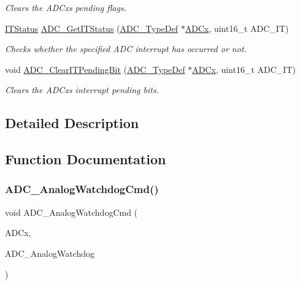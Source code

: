 \begin{DoxyCompactItemize}
\begin{DoxyCompactList}\small\item\em Clears the A\+D\+Cx\textquotesingle{}s pending flags. \end{DoxyCompactList}\item 
\mbox{\hyperlink{group___exported__types_gaacbd7ed539db0aacd973a0f6eca34074}{I\+T\+Status}} \mbox{\hyperlink{group___a_d_c___private___functions_gaa1d3b910a83dbf14d4f68c8eef058612}{A\+D\+C\+\_\+\+Get\+I\+T\+Status}} (\mbox{\hyperlink{struct_a_d_c___type_def}{A\+D\+C\+\_\+\+Type\+Def}} $\ast$\mbox{\hyperlink{group___s_t_m32_f1_x_x___n_u_c_l_e_o___l_o_w___l_e_v_e_l___exported___constants_gab44c1065d38c298955fc028346984340}{A\+D\+Cx}}, uint16\+\_\+t A\+D\+C\+\_\+\+IT)
\begin{DoxyCompactList}\small\item\em Checks whether the specified A\+DC interrupt has occurred or not. \end{DoxyCompactList}\item 
void \mbox{\hyperlink{group___a_d_c___private___functions_ga601c6a67bd883eb631ecc7aa5e999b9c}{A\+D\+C\+\_\+\+Clear\+I\+T\+Pending\+Bit}} (\mbox{\hyperlink{struct_a_d_c___type_def}{A\+D\+C\+\_\+\+Type\+Def}} $\ast$\mbox{\hyperlink{group___s_t_m32_f1_x_x___n_u_c_l_e_o___l_o_w___l_e_v_e_l___exported___constants_gab44c1065d38c298955fc028346984340}{A\+D\+Cx}}, uint16\+\_\+t A\+D\+C\+\_\+\+IT)
\begin{DoxyCompactList}\small\item\em Clears the A\+D\+Cx\textquotesingle{}s interrupt pending bits. \end{DoxyCompactList}\end{DoxyCompactItemize}


\subsection{Detailed Description}


\subsection{Function Documentation}
\mbox{\label{group___a_d_c___private___functions_gad017d69bec6e497afd35ba25ea22d86e}} 
\subsubsection{\texorpdfstring{ADC\_AnalogWatchdogCmd()}{ADC\_AnalogWatchdogCmd()}}
{\footnotesize\ttfamily void A\+D\+C\+\_\+\+Analog\+Watchdog\+Cmd (\begin{DoxyParamCaption}\item[{\mbox{\hyperlink{struct_a_d_c___type_def}{A\+D\+C\+\_\+\+Type\+Def}} $\ast$}]{A\+D\+Cx,  }\item[{uint32\+\_\+t}]{A\+D\+C\+\_\+\+Analog\+Watchdog }\end{DoxyParamCaption})}



